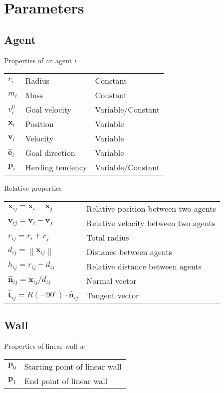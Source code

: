 \section{Parameters}
\subsection{Agent}
Properties of an agent $ i $
\begin{table}[H]
\centering
\begin{tabular}{lll}
$ r_{i} $                & Radius           & Constant \\
$ m_{i} $                & Mass             & Constant \\
$ v_{i}^{0} $            & Goal velocity    & Variable/Constant \\
$ \mathbf{x}_{i} $       & Position         & Variable \\
$ \mathbf{v}_{i} $       & Velocity         & Variable \\
$ \hat{\mathbf{e}}_{i} $ & Goal direction   & Variable \\
$ \mathbf{p}_i $         & Herding tendency & Variable/Constant \\
\end{tabular}
\end{table}

Relative properties
\begin{table}[H]
\centering
\begin{tabular}{ll}
$ \mathbf{x}_{ij} = \mathbf{x}_{i} - \mathbf{x}_{j} $ & Relative position between two agents \\
$ \mathbf{v}_{ij} = \mathbf{v}_{i} - \mathbf{v}_{j} $ & Relative velocity between two agents \\
$ r_{ij} = r_{i} + r_{j} $ & Total radius \\
$ d_{ij} = \left\|\mathbf{x}_{ij}\right\| $ & Distance between agents \\
$ h_{ij} = r_{ij} - d_{ij} $ & Relative distance between agents \\
$ \hat{\mathbf{n}}_{ij} = \mathbf{x}_{ij} / d_{ij} $ & Normal vector \\
$ \hat{\mathbf{t}}_{ij} = R(-90^{\circ}) \cdot \hat{\mathbf{n}}_{ij} $ & Tangent vector \\
\end{tabular}
\end{table}

\subsection{Wall}
Properties of linear wall $ w $
\begin{table}[H]
\begin{tabular}{ll}
$ \mathbf{p}_{0} $ & Starting point of linear wall \\
$ \mathbf{p}_{1} $ & End point of linear wall \\
\end{tabular}
\end{table}

